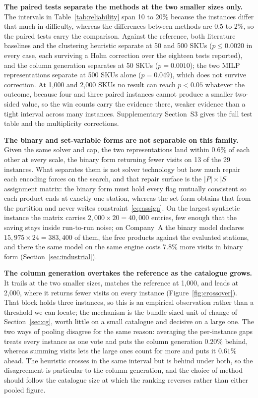 \documentclass[]{interact}
\begin{document}
\textbf{The paired tests separate the methods at the two smaller sizes only.} The intervals in Table~\ref{tab:reliability} span 10 to 20\% because the instances differ that much in difficulty, whereas the differences between methods are 0.5 to 2\%, so the paired tests carry the comparison. Against the reference, both literature baselines and the clustering heuristic separate at 50 and 500 SKUs ($p \le 0.0020$ in every case, each surviving a Holm correction over the eighteen tests reported), and the column generation separates at 50 SKUs ($p = 0.0010$); the two MILP representations separate at 500 SKUs alone ($p = 0.049$), which does not survive correction. At 1{,}000 and 2{,}000 SKUs no result can reach $p < 0.05$ whatever the outcome, because four and three paired instances cannot produce a smaller two-sided value, so the win counts carry the evidence there, weaker evidence than a tight interval across many instances. Supplementary Section~S3 gives the full test table and the multiplicity corrections.

\textbf{The binary and set-variable forms are not separable on this family.} Given the same solver and cap, the two representations land within 0.6\% of each other at every scale, the binary form returning fewer visits on 13 of the 29 instances. What separates them is not solver technology but how much repair each encoding forces on the search, and that repair surface is the $|P| \times |S|$ assignment matrix: the binary form must hold every flag mutually consistent so each product ends at exactly one station, whereas the set form obtains that from the partition and never writes constraint~\eqref{eq:assign}. On the largest synthetic instance the matrix carries $2{,}000 \times 20 = 40{,}000$ entries, few enough that the saving stays inside run-to-run noise; on Company~A the binary model declares $15{,}975 \times 24 = 383{,}400$ of them, the free products against the evaluated stations, and there the same model on the same engine costs 7.8\% more visits in binary form (Section~\ref{sec:industrial}).

\textbf{The column generation overtakes the reference as the catalogue grows.} It trails at the two smaller sizes, matches the reference at 1,000, and leads at 2,000, where it returns fewer visits on every instance (Figure~\ref{fig:crossover}). That block holds three instances, so this is an empirical observation rather than a threshold we can locate; the mechanism is the bundle-sized unit of change of Section~\ref{sec:cg}, worth little on a small catalogue and decisive on a large one. The two ways of pooling disagree for the same reason: averaging the per-instance gaps treats every instance as one vote and puts the column generation $0.20\%$ behind, whereas summing visits lets the large ones count for more and puts it $0.61\%$ ahead. The heuristic crosses in the same interval but is behind under both, so the disagreement is particular to the column generation, and the choice of method should follow the catalogue size at which the ranking reverses rather than either pooled figure.
\end{document}

